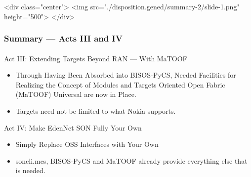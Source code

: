 \begin{htmlonly}

\begin{frame}[fragile,plain,label=summary-2]
    \frametitle{}
    \framesubtitle{}
    \begin{rawhtml}
<div class="center">
<img src="./disposition.gened/summary-2/slide-1.png" height="500">
</div>
    \end{rawhtml}
\end{frame}
\end{htmlonly}

\begin{verblatex}

\begin{frame}[fragile,plain,label=summary-2]
    \frametitle{Summary --- Acts III and IV}
    \framesubtitle{}

    \begin{exampleblock}{Act III: Extending Targets Beyond RAN --- With MaTOOF}
    \end{exampleblock}

\begin{itemize}
  \item Through Having Been Absorbed into BISOS-PyCS, Needed Facilities for Realizing the Concept of Modules and Targets Oriented Open
  Fabric (MaTOOF) Universal are now in Place.
  \item Targets need not be limited to what Nokia supports.
\end{itemize}


      \begin{block}{Act IV: Make EdenNet SON Fully Your Own}

    \end{block}


\begin{itemize}
  \item Simply Replace OSS Interfaces with Your Own
  \item soncli.mcs, BISOS-PyCS and MaTOOF already provide everything else that is needed.
\end{itemize}


\end{frame}
\end{verblatex}

